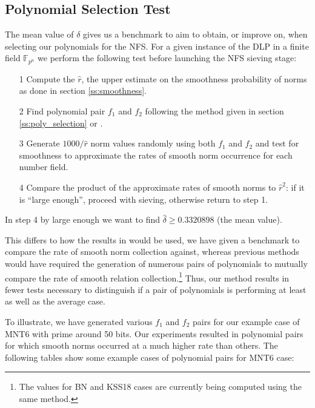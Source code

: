 \documentclass[a4paper, 12pt, envcountsect, runningheads]{llncs}
\newcommand{\F}{{\mathbb F}}
\numberwithin{figure}{section}
\numberwithin{equation}{section}
\begin{document}
\subsection{Polynomial Selection Test}
\label{ss:poly_test}
The mean value of $\delta$ gives us a benchmark to aim to obtain, or improve on, when selecting our polynomials for the NFS. For a given instance of the DLP in a finite field $\F_{p^n}$ we perform the following test before launching the NFS sieving stage:
\begin{itemize}
\item[1] Compute the $\hat{r}$, the upper estimate on the smoothness probability of norms as done in section \ref{ss:smoothness}.
\item[2] Find polynomial pair $f_1$ and $f_2$ following the method given in section \ref{ss:poly_selection} or \cite{joux-lercier-smart-vercauteren06}.
\item[3] Generate $1000/\hat{r}$ \cite{dan_predicting_nfs} norm values randomly using both $f_1$ and $f_2$ and test for smoothness to approximate the rates of smooth norm occurrence for each number field.
\item[4] Compare the product of the approximate rates of smooth norms to $\hat{r}^2$: if it is ``large enough'', proceed with sieving, otherwise return to step 1.
\end{itemize}
In step 4 by large enough we want to find $\hat{\delta}\geq0.3320898$ (the mean value).

This differs to how the results in \cite{zajac} would be used, we have given a benchmark to compare the rate of smooth norm collection against, whereas previous methods would have required the generation of numerous pairs of polynomials to mutually compare the rate of smooth relation collection.\footnote{The values for BN and KSS18 cases are currently being computed using the same method.} Thus, our method results in fewer tests necessary to distinguish if a pair of polynomials is performing at least as well as the average case.

To illustrate, we have generated various $f_1$ and $f_2$ pairs for our example case of MNT6 with prime around 50 bits. Our experiments resulted in polynomial pairs for which smooth norms occurred at a much higher rate than others. The following tables show some example cases of polynomial pairs for MNT6 case:\\
\end{document}
